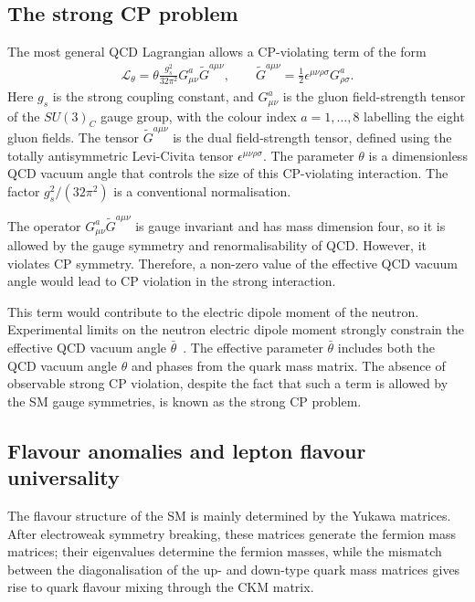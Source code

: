 \subsection{The strong CP problem}
\label{subsec:strong_cp}

The most general QCD Lagrangian allows a CP-violating term of the form
\begin{align}
    \mathcal{L}_{\theta}
    =
    \theta
    \frac{g_{s}^{2}}{32\pi^{2}}
    G_{\mu\nu}^{a}
    \tilde{G}^{a\mu\nu},
    \qquad
    \tilde{G}^{a\mu\nu}
    =
    \frac{1}{2}
    \epsilon^{\mu\nu\rho\sigma}
    G_{\rho\sigma}^{a}.
    \label{eq:qcd_theta_term}
\end{align}
Here $g_{s}$ is the strong coupling constant, and $G_{\mu\nu}^{a}$ is the gluon field-strength tensor of the $SU(3)_{C}$ gauge group, with the colour index $a=1,\ldots,8$ labelling the eight gluon fields. 
The tensor $\tilde{G}^{a\mu\nu}$ is the dual field-strength tensor, defined using the totally antisymmetric Levi-Civita tensor $\epsilon^{\mu\nu\rho\sigma}$. 
The parameter $\theta$ is a dimensionless QCD vacuum angle that controls the size of this CP-violating interaction. 
The factor $g_{s}^{2}/(32\pi^{2})$ is a conventional normalisation.

The operator $G_{\mu\nu}^{a}\tilde{G}^{a\mu\nu}$ is gauge invariant and has mass dimension four, so it is allowed by the gauge symmetry and renormalisability of QCD. 
However, it violates CP symmetry. Therefore, a non-zero value of the effective QCD vacuum angle would lead to CP violation in the strong interaction.

This term would contribute to the electric dipole moment of the neutron. 
Experimental limits on the neutron electric dipole moment strongly constrain the effective QCD vacuum angle $\bar{\theta}$~\cite{Baker2006}. 
The effective parameter $\bar{\theta}$ includes both the QCD vacuum angle $\theta$ and phases from the quark mass matrix. 
The absence of observable strong CP violation, despite the fact that such a term is allowed by the SM gauge symmetries, is known as the strong CP problem.


\subsection{Flavour anomalies and lepton flavour universality}
\label{subsec:flavour_anomalies}

The flavour structure of the SM is mainly determined by the Yukawa matrices. 
After electroweak symmetry breaking, these matrices generate the fermion mass matrices; their eigenvalues determine the fermion masses, while the mismatch between the diagonalisation of the up- and down-type quark mass matrices gives rise to quark flavour mixing through the CKM matrix.

